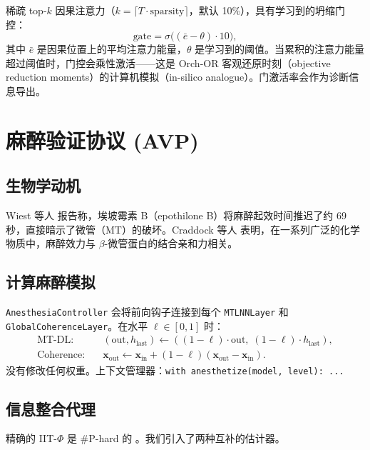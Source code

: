 \documentclass[11pt]{article}
\theoremstyle{definition}
\newcommand{\vx}{\mathbf{x}}
\newcommand{\sigmoid}{\sigma}
\begin{document}
稀疏 top-$k$ 因果注意力（$k=\lceil T\cdot\text{sparsity}\rceil$，默认 10\%），具有学习到的坍缩门控：
\begin{equation}
  \text{gate} = \sigmoid\!\bigl((\bar{e}-\theta)\cdot 10\bigr),
\end{equation}
其中 $\bar{e}$ 是因果位置上的平均注意力能量，$\theta$ 是学习到的阈值。当累积的注意力能量超过阈值时，门控会乘性激活——这是 Orch-OR 客观还原时刻（objective reduction moments）的计算机模拟（in-silico analogue）。门激活率会作为诊断信息导出。

\section{麻醉验证协议 (AVP)}
\label{sec:avp}

\subsection{生物学动机}
Wiest 等人 \citep{wiest2025quantum} 报告称，埃坡霉素 B（epothilone B）将麻醉起效时间推迟了约 69 秒，直接暗示了微管（MT）的破坏。Craddock 等人 \citep{craddock2017anesthetic} 表明，在一系列广泛的化学物质中，麻醉效力与 $\beta$-微管蛋白的结合亲和力相关。

\subsection{计算麻醉模拟}
\texttt{AnesthesiaController} 会将前向钩子连接到每个 \texttt{MTLNNLayer} 和 \texttt{GlobalCoherenceLayer}。在水平 $\ell\in[0,1]$ 时：
\begin{align}
  \text{MT-DL:}& \quad (\text{out}, h_\text{last}) \leftarrow ((1-\ell)\cdot\text{out},\;(1-\ell)\cdot h_\text{last}), \\
  \text{Coherence:}& \quad \vx_\text{out} \leftarrow \vx_\text{in} + (1-\ell)(\vx_\text{out}-\vx_\text{in}).
\end{align}
没有修改任何权重。上下文管理器：\texttt{with anesthetize(model, level): ...}

\subsection{信息整合代理}
\label{sec:proxies}
精确的 IIT-$\Phi$ 是 \#P-hard 的 \citep{aaronson2014why}。我们引入了两种互补的估计器。
\end{document}
